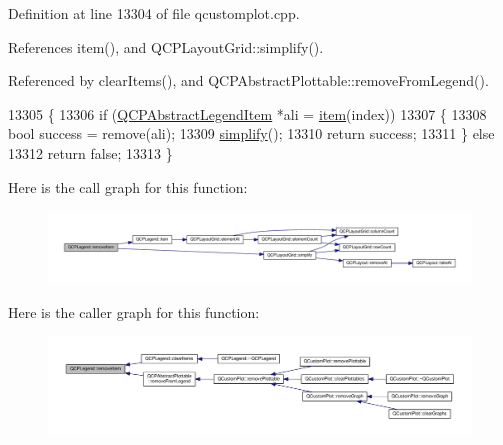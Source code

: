 Definition at line 13304 of file qcustomplot.\+cpp.



References item(), and Q\+C\+P\+Layout\+Grid\+::simplify().



Referenced by clear\+Items(), and Q\+C\+P\+Abstract\+Plottable\+::remove\+From\+Legend().


\begin{DoxyCode}
13305 \{
13306   \textcolor{keywordflow}{if} (\hyperlink{class_q_c_p_abstract_legend_item}{QCPAbstractLegendItem} *ali = \hyperlink{class_q_c_p_legend_a454272d7094437beb3278a2294006da5}{item}(index))
13307   \{
13308     \textcolor{keywordtype}{bool} success = \textcolor{keyword}{remove}(ali);
13309     \hyperlink{class_q_c_p_layout_grid_a08bba60e4acd20165526a8fd7f986b58}{simplify}();
13310     \textcolor{keywordflow}{return} success;
13311   \} \textcolor{keywordflow}{else}
13312     \textcolor{keywordflow}{return} \textcolor{keyword}{false};
13313 \}
\end{DoxyCode}


Here is the call graph for this function\+:\nopagebreak
\begin{figure}[H]
\begin{center}
\leavevmode
\includegraphics[width=350pt]{class_q_c_p_legend_ac91595c3eaa746fe6321d2eb952c63bb_cgraph}
\end{center}
\end{figure}




Here is the caller graph for this function\+:\nopagebreak
\begin{figure}[H]
\begin{center}
\leavevmode
\includegraphics[width=350pt]{class_q_c_p_legend_ac91595c3eaa746fe6321d2eb952c63bb_icgraph}
\end{center}
\end{figure}


\hypertarget{class_q_c_p_legend_a2aea4ec6da2d454dd0b241a254d65082}{}
